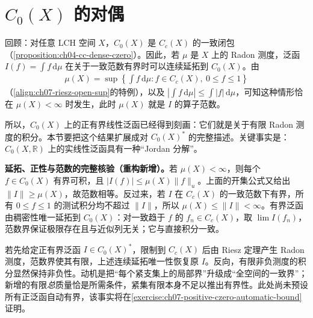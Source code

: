\documentclass[../../main.tex]{subfiles}
\begin{document}
\section{$C_0(X)$ 的对偶}\label{section:ch07-czero-dual}
回顾：对任意 LCH 空间 $X$，$C_0(X)$ 是 $C_c(X)$ 的一致闭包（\cref{proposition:ch04-cc-dense-czero}）。因此，若 $\mu$ 是 $X$ 上的 Radon 测度，泛函 $I(f)=\int f\,\mathrm d\mu$ 在关于一致范数有界时可以连续延拓到 $C_0(X)$。由
\begin{align*}
\mu(X)=\sup\left\{\int f\,\mathrm d\mu:f\in C_c(X),\ 0\leqslant f\leqslant1\right\}
\end{align*}
（\cref{align:ch07-riesz-open-sup}的特例），以及 $|\int f\,\mathrm d\mu|\leqslant\int|f|\,\mathrm d\mu$，可知这种情形恰在 $\mu(X)<\infty$ 时发生，此时 $\mu(X)$ 就是 $I$ 的算子范数。

所以，$C_0(X)$ 上的正有界线性泛函已经得到刻画：它们就是关于有限 Radon 测度的积分。本节要把这个结果扩展成对 $C_0(X)^*$ 的完整描述。关键事实是：$C_0(X,\mathbb R)$ 上的实线性泛函具有一种“Jordan 分解”。
\begin{remark}
\textbf{延拓、正性与范数的完整核验（重构新增）。}若 $\mu(X)<\infty$，则每个 $f\in C_0(X)$ 有界可积，且 $|I(f)|\leqslant\mu(X)\|f\|_u$。上面的开集公式又给出 $\|I\|\geqslant\mu(X)$，故范数相等。反过来，若 $I$ 在 $C_c(X)$ 的一致范数下有界，所有 $0\leqslant f\leqslant1$ 的测试积分均不超过 $\|I\|$，所以 $\mu(X)\leqslant\|I\|<\infty$。有界泛函由稠密性唯一延拓到 $C_0(X)$：对一致趋于 $f$ 的 $f_n\in C_c(X)$，取 $\lim I(f_n)$，范数界保证极限存在且与近似列无关；它与直接积分一致。

若先给定正有界泛函 $I\in C_0(X)^*$，限制到 $C_c(X)$ 后由 Riesz 定理产生 Radon 测度，范数界使其有限，上述连续延拓唯一性恢复原 $I$。反向，有限非负测度的积分显然保持非负性。动机是把“每个紧支集上的局部界”升级成“全空间的一致界”；新增的有限\emph{总}质量恰是所需条件，紧集有限本身不足以推出有界性。此处尚未预设所有正泛函自动有界，该事实将在\cref{exercise:ch07-positive-czero-automatic-bound}证明。
\end{remark}
\end{document}
